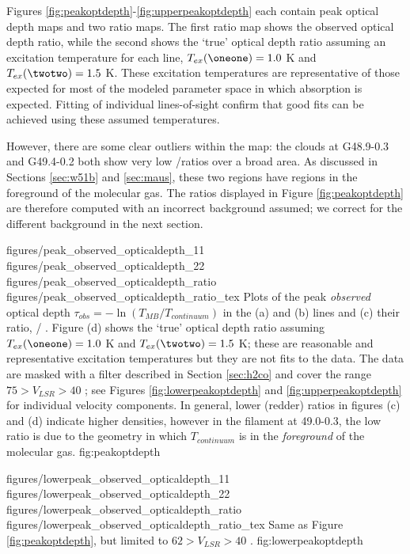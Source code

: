 Figures \ref{fig:peakoptdepth}-\ref{fig:upperpeakoptdepth} each contain
peak optical depth maps and two ratio maps.  The first ratio map shows the observed
optical depth ratio, while the second shows the `true' optical depth
ratio assuming an excitation temperature for each line, $T_{ex}(\oneone) = 1.0$
K and $T_{ex}(\twotwo) = 1.5$ K.  These excitation temperatures are
representative of those expected for most of the modeled parameter space in
which absorption is expected.  Fitting of individual lines-of-sight confirm
that good fits can be achieved using these assumed temperatures.

However, there are some clear outliers within the map: the clouds at G48.9-0.3
and G49.4-0.2 both show very low \oneone/\twotwo ratios over a broad area.  As
discussed in Sections \ref{sec:w51b} and \ref{sec:maus}, these two regions have
\hii regions in the foreground of the molecular gas.  The ratios displayed in
Figure \ref{fig:peakoptdepth} are therefore computed with an incorrect
background assumed; we correct for the different background in the next section.

\FigureFourPDF
{figures/peak_observed_opticaldepth_11}
{figures/peak_observed_opticaldepth_22}
{figures/peak_observed_opticaldepth_ratio}
{figures/peak_observed_opticaldepth_ratio_tex}
{Plots of the peak \emph{observed} optical depth $\tau_{obs} =
-\ln(T_{MB}/T_{continuum})$ in the (a) \oneone and (b) \twotwo lines and (c)
their ratio, \oneone / \twotwo.  Figure (d) shows the `true' optical depth ratio
assuming $T_{ex}(\oneone) = 1.0$ K and $T_{ex}(\twotwo) = 1.5$ K; these are
reasonable and representative excitation temperatures but they are not fits to
the data.
The data are masked with a filter described in Section \ref{sec:h2co} and cover
the range $75 > V_{LSR} > 40$ \kms; see Figures \ref{fig:lowerpeakoptdepth} and
\ref{fig:upperpeakoptdepth} for individual velocity components.  In general,
lower (redder) ratios in figures (c) and (d) indicate higher densities, however
in the filament at 49.0-0.3, the low ratio is due to the geometry in which
$T_{continuum}$ is in the \emph{foreground} of the molecular gas.}
{fig:peakoptdepth}


\FigureFourPDF
{figures/lowerpeak_observed_opticaldepth_11}
{figures/lowerpeak_observed_opticaldepth_22}
{figures/lowerpeak_observed_opticaldepth_ratio}
{figures/lowerpeak_observed_opticaldepth_ratio_tex}
{Same as Figure \ref{fig:peakoptdepth}, but limited to $62 > V_{LSR} > 40$ \kms.}
{fig:lowerpeakoptdepth}

